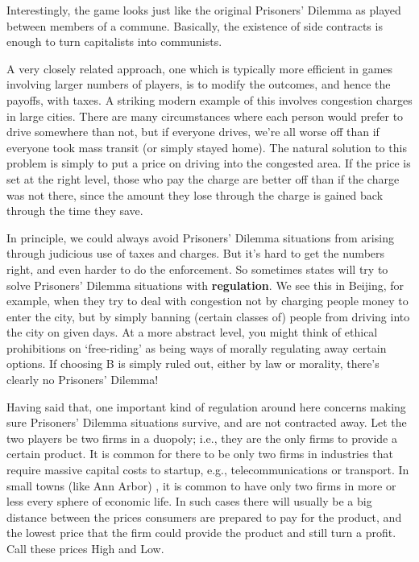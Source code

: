 \noindent Interestingly, the game looks just like the original Prisoners' Dilemma as played between members of a commune. Basically, the existence of side contracts is enough to turn capitalists into communists. 

A very closely related approach, one which is typically more efficient in games involving larger numbers of players, is to modify the outcomes, and hence the payoffs, with taxes. A striking modern example of this involves congestion charges in large cities. There are many circumstances where each person would prefer to drive somewhere than not, but if everyone drives, we're all worse off than if everyone took mass transit (or simply stayed home). The natural solution to this problem is simply to put a price on driving into the congested area. If the price is set at the right level, those who pay the charge are better off than if the charge was not there, since the amount they lose through the charge is gained back through the time they save.

In principle, we could always avoid Prisoners' Dilemma situations from arising through judicious use of taxes and charges. But it's hard to get the numbers right, and even harder to do the enforcement. So sometimes states will try to solve Prisoners' Dilemma situations with \textbf{regulation}. We see this in Beijing, for example, when they try to deal with congestion not by charging people money to enter the city, but by simply banning (certain classes of) people from driving into the city on given days. At a more abstract level, you might think of ethical prohibitions on `free-riding' as being ways of morally regulating away certain options. If choosing B is simply ruled out, either by law or morality, there's clearly no Prisoners' Dilemma!

Having said that, one important kind of regulation around here concerns making sure Prisoners' Dilemma situations survive, and are not contracted away. Let the two players be two firms in a duopoly; i.e., they are the only firms to provide a certain product. It is common for there to be only two firms in industries that require massive capital costs to startup, e.g., telecommunications or transport. In small towns (like Ann Arbor) , it is common to have only two firms in more or less every sphere of economic life. In such cases there will usually be a big distance between the prices consumers are prepared to pay for the product, and the lowest price that the firm could provide the product and still turn a profit. Call these prices High and Low. 

